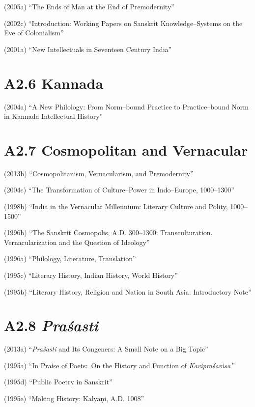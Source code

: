 (2005a) “The Ends of Man at the End of Premodernity”

(2002c) “Introduction: Working Papers on Sanskrit Knowledge–Systems on the Eve of Colonialism”

(2001a) “New Intellectuals in Seventeen Century India”


\section*{A2.6 Kannada}

(2004a) “A New Philology: From Norm–bound Practice to Practice–bound Norm in Kannada Intellectual History”

\vspace{-.3cm}

\section*{A2.7 Cosmopolitan and Vernacular}

(2013b) “Cosmopolitanism, Vernacularism, and Premodernity”

(2004c) “The Transformation of Culture–Power in Indo–Europe, 1000–1300”

(1998b) “India in the Vernacular Millennium: Literary Culture and Polity, 1000–1500”

(1996b) “The Sanskrit Cosmopolis, A.D. 300–1300: Transculturation, Vernacularization and the Question of Ideology”

(1996a) “Philology, Literature, Translation”

(1995c) “Literary History, Indian History, World History”

(1995b) “Literary History, Religion and Nation in South Asia: Introductory Note”

\vspace{-.4cm}

\section*{A2.8 {\it {\bfseries Praśasti}}}

(2013a) “\textit{Praśasti} and Its Congeners: A Small Note on a Big Topic”

(1995a) “In Praise of Poets:~On the History and Function of \textit{Kavipraśaṁsā”}

(1995d) “Public Poetry in Sanskrit”

(1995e) “Making History: Kalyāṇi, A.D. 1008”

